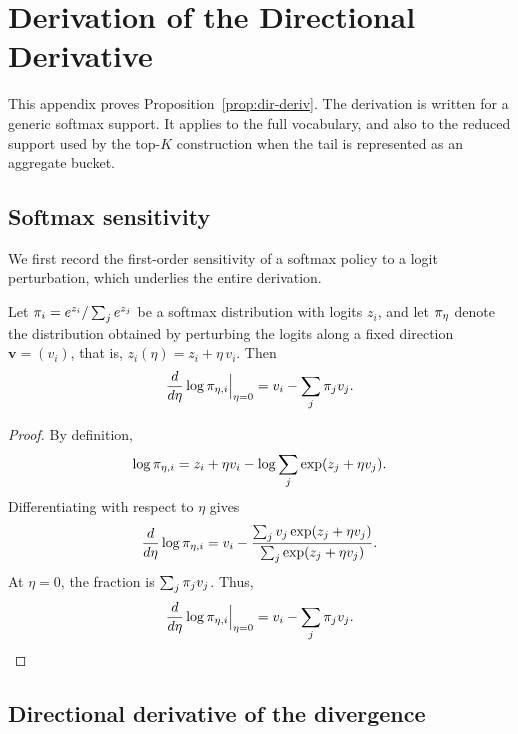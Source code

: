 \clearpage
\section{Derivation of the Directional Derivative}
\label{app:derivations}

This appendix proves Proposition~\ref{prop:dir-deriv}.
The derivation is written for a generic softmax support.
It applies to the full vocabulary, and also to the reduced support used by the
top-$K$ construction when the tail is represented as an aggregate bucket.

\subsection{Softmax sensitivity}

We first record the first-order sensitivity of a softmax policy to a logit
perturbation, which underlies the entire derivation.

\begin{lemma}
\label{lem:softmax-sensitivity}
Let $\pi_i=e^{z_i}/\sum_j e^{z_j}$ be a softmax distribution with logits $z_i$, and let
$\pi_{\eta}$ denote the distribution obtained by perturbing the logits along a fixed
direction $\bm v=(v_i)$, that is, $z_i(\eta)=z_i+\eta\,v_i$. Then
\begin{equation}
\label{eq:app-logderiv}
\frac{d}{d\eta}\log\pi_{\eta,i}\Big|_{\eta=0}
= v_i - \sum_j \pi_j v_j.
\end{equation}
\end{lemma}

\begin{proof}
By definition,
\begin{equation}
\log\pi_{\eta,i}
= z_i+\eta v_i-\log\sum_j \exp(z_j+\eta v_j).
\end{equation}
Differentiating with respect to $\eta$ gives
\begin{equation}
\frac{d}{d\eta}\log\pi_{\eta,i}
= v_i -
\frac{\sum_j v_j\exp(z_j+\eta v_j)}
{\sum_j \exp(z_j+\eta v_j)}.
\end{equation}
At $\eta=0$, the fraction is $\sum_j\pi_j v_j$.
Thus,
\begin{equation}
\frac{d}{d\eta}\log\pi_{\eta,i}\Big|_{\eta=0}
= v_i-\sum_j\pi_j v_j .
\end{equation}
\end{proof}


\subsection{Directional derivative of the divergence}

